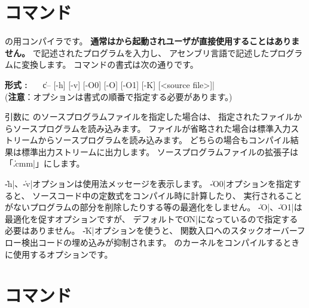 \section{{\cmmc}コマンド}
\label{command:cmmc}

{\cmml}の{\tac}用コンパイラです。
{\bf 通常は{\cme}から起動されユーザが直接使用することはありません。}
\cmml で記述されたプログラムを入力し、
\tac アセンブリ言語で記述したプログラムに変換します。
\cmmc コマンドの書式は次の通りです。

\begin{flushleft}
{\bf 形式 : }~~~\|c-- [-h] [-v] [-O0] [-O] [-O1] [-K] [<source file>]|\\
({\bf 注意}：オプションは書式の順番で指定する必要があります。)
\end{flushleft}

引数に \cmml のソースプログラムファイルを指定した場合は、
指定されたファイルからソースプログラムを読み込みます。
ファイルが省略された場合は標準入力ストリームからソースプログラムを読み込みます。
どちらの場合もコンパイル結果は標準出力ストリームに出力します。
ソースプログラムファイルの拡張子は「\|.cmm|」にします。

\|-h|、\|-v|オプションは使用法メッセージを表示します。
\|-O0|オプションを指定すると、
ソースコード中の定数式をコンパイル時に計算したり、
実行されることがないプログラムの部分を削除したりする等の最適化をしません。
\|-O|、\|-O1|は最適化を促すオプションですが、
デフォルトで\|ON|になっているので指定する必要はありません。
\|-K|オプションを使うと、
関数入口へのスタックオーバーフロー検出コードの埋め込みが抑制されます。
\tacos のカーネルをコンパイルするときに使用するオプションです。

%
%

\section{{\ccmmc}コマンド}
\label{command:ccmmc}

